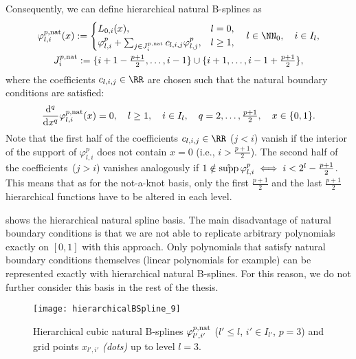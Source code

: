 %
Consequently, we can define hierarchical natural B-splines as
\begin{subequations}
  \begin{gather}
    \varphi_{l,i}^{p,\ntrl}(x)
    :=
    \begin{cases}
      L_{0,i}(x),&
      l = 0,\\
      \varphi_{l,i}^p +
      \sum_{j \in J_i^{p,\ntrl}} c_{l,i,j} \varphi_{l,j}^p,&
      l \ge 1,
    \end{cases}\quad
    l \in \NN_0,\quad
    i \in I_l,\\
    J_i^{p,\ntrl}
    := \{i+1-\tfrac{p+1}{2}, \dotsc, i-1\} \cup
    \{i+1, \dotsc, i-1+\tfrac{p+1}{2}\},
  \end{gather}
\end{subequations}
where the coefficients $c_{l,i,j} \in \RR$ are chosen such that
the natural boundary conditions are satisfied:
\begin{equation}
  \frac{\mathop{}\!\mathrm{d}^q}{\mathop{}\!\mathrm{d}{}x^q} \varphi_{l,i}^{p,\mathrm{nat}}(x)
  = 0,\quad
  l \ge 1,\quad
  i \in I_l,\quad
  q = 2, \dotsc, \tfrac{p+1}{2},\quad
  x \in \{0, 1\}.
\end{equation}
%
Note that the first half of the coefficients $c_{l,i,j} \in \RR$
($j < i$) vanish if the interior of the support of $\varphi_{l,i}^p$
does not contain $x = 0$
(i.e., $i > \tfrac{p+1}{2}$).
The second half of the coefficients~($j > i$) vanishes analogously
if $1 \notin \operatorname{\mathring{\operatorname{supp}}} \varphi_{l,i}^p \iff i < 2^l - \tfrac{p+1}{2}$.
This means that as for the not-a-knot basis,
only the first $\tfrac{p+1}{2}$ and the last $\tfrac{p+1}{2}$
hierarchical functions have to be altered in each level.

 shows the hierarchical natural spline basis.
The main disadvantage of natural boundary conditions is that
we are not able to replicate arbitrary polynomials exactly on $[0, 1]$
with this approach.
Only polynomials that satisfy natural boundary conditions themselves
(linear polynomials for example)
can be represented exactly with hierarchical natural B-splines.
For this reason, we do not further consider this basis in the
rest of the thesis.

\begin{SCfigure}
  \texttt{[image: hierarchicalBSpline\_9]}%
  \caption{%
    Hierarchical cubic natural B-splines
    $\varphi_{l',i'}^{p,\mathrm{nat}}$
    ($l' \le l$, $i' \in I_{l'}$, $p = 3$) and
    grid points $x_{l',i'}$ \emph{(dots)} up to level $l = 3$.%
  }%
  \label{fig:naturalBSpline}%
\end{SCfigure}
